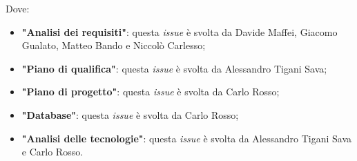 Dove:
\begin{itemize}
	\item \textbf{"Analisi dei requisiti"}: questa \textit{issue} è svolta da
	      Davide Maffei, Giacomo Gualato, Matteo Bando e Niccolò Carlesso;

	\item \textbf{"Piano di qualifica"}: questa \textit{issue} è svolta da
	      Alessandro Tigani Sava;

	\item \textbf{"Piano di progetto"}: questa \textit{issue} è svolta da Carlo
	      Rosso;

	\item \textbf{"Database"}: questa \textit{issue} è svolta da Carlo Rosso;

	\item \textbf{"Analisi delle tecnologie"}: questa \textit{issue} è svolta da
	      Alessandro Tigani Sava e Carlo Rosso.
\end{itemize}
